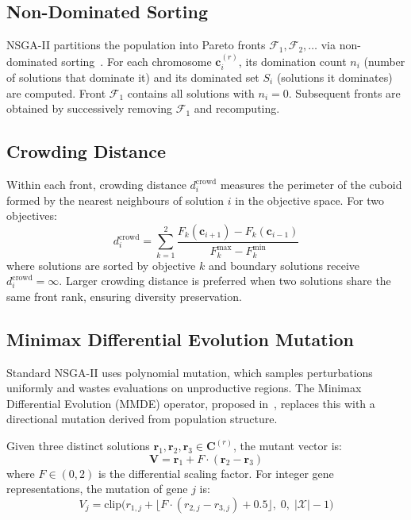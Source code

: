 \documentclass[12pt,a4paper]{article}
\theoremstyle{definition}
\theoremstyle{remark}
\begin{document}
\subsection{Non-Dominated Sorting}

NSGA-II partitions the population into Pareto fronts $\mathcal{F}_1, \mathcal{F}_2,
\ldots$ via non-dominated sorting~\cite{jafari2021}. For each chromosome
$\mathbf{c}^{(r)}_i$, its domination count $n_i$ (number of solutions that
dominate it) and its dominated set $S_i$ (solutions it dominates) are computed.
Front $\mathcal{F}_1$ contains all solutions with $n_i = 0$. Subsequent fronts
are obtained by successively removing $\mathcal{F}_1$ and recomputing.

\subsection{Crowding Distance}

Within each front, crowding distance $d_i^{\text{crowd}}$ measures the
perimeter of the cuboid formed by the nearest neighbours of solution $i$
in the objective space. For two objectives:
\begin{equation}
  d_i^{\text{crowd}} = \sum_{k=1}^{2}
  \frac{F_k(\mathbf{c}_{i+1}) - F_k(\mathbf{c}_{i-1})}
  {F_k^{\max} - F_k^{\min}}
  \label{eq:crowding}
\end{equation}
where solutions are sorted by objective $k$ and boundary solutions receive
$d_i^{\text{crowd}} = \infty$. Larger crowding distance is preferred when
two solutions share the same front rank, ensuring diversity preservation.

\subsection{Minimax Differential Evolution Mutation}

Standard NSGA-II uses polynomial mutation, which samples perturbations
uniformly and wastes evaluations on unproductive regions. The Minimax
Differential Evolution (MMDE) operator, proposed in~\cite{jafari2021},
replaces this with a directional mutation derived from population structure.

Given three distinct solutions $\mathbf{r}_1, \mathbf{r}_2, \mathbf{r}_3
\in \mathbf{C}^{(r)}$, the mutant vector is:
\begin{equation}
  \mathbf{V} = \mathbf{r}_1 + F \cdot (\mathbf{r}_2 - \mathbf{r}_3)
  \label{eq:mmde}
\end{equation}
where $F \in (0, 2)$ is the differential scaling factor. For integer gene
representations, the mutation of gene $j$ is:
\begin{equation}
  V_j = \mathrm{clip}\bigl(
    r_{1,j} + \lfloor F \cdot (r_{2,j} - r_{3,j}) + 0.5 \rfloor,
    \; 0,\; |\mathcal{X}| - 1
  \bigr)
  \label{eq:mmde_int}
\end{equation}
\end{document}
